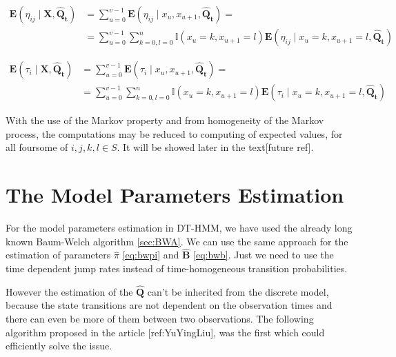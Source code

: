 \documentclass[thesis=M,english]{FITthesis}[2012/10/20]
\newcommand{\matr}[1]{\mathbf{#1}}
\begin{document}
\begin{equation}
\begin{aligned}  
\mathbf{E}(\eta_{ij} \mid \matr{X}, \matr{\hat Q_t} ) &= \sum_{u=0}^{v-1} \mathbf{E}(\eta_{ij} \mid x_u, x_{u+1}, \matr{ \hat Q_t } ) = \\
&= \sum_{u=0}^{v-1} \sum_{k=0,l=0}^{n} \mathbb{I}( x_u = k, x_{u+1} = l ) \mathbf{E}(\eta_{ij} \mid x_u = k, x_{u+1} = l, \matr{\hat Q_t} )
\end{aligned}
\end{equation}


\begin{equation}
\begin{aligned}  
\mathbf{E}( \tau_i \mid \matr{X}, \matr{\hat Q_t} ) &= \sum_{u=0}^{v-1} \mathbf{E}(\tau_i \mid x_u, x_{u+1}, \matr{ \hat Q_t } ) = \\
&= \sum_{u=0}^{v-1} \sum_{k=0,l=0}^{n} \mathbb{I}( x_u = k, x_{u+1} = l ) \mathbf{E}(\tau_i \mid x_u = k, x_{u+1} = l, \matr{\hat Q_t} )
\end{aligned}
\end{equation}
   
With the use of the Markov property and from homogeneity of the Markov process, the computations may be reduced to computing of expected values, for all foursome of $i,j,k,l \in S$. It will be showed later in the text[future ref].     
   
\section{The Model Parameters Estimation}


For the model parameters estimation in DT-HMM, we have used the already long known Baum-Welch algorithm \ref{sec:BWA}. We can use the same approach for the estimation of parameters $\hat \pi$ \eqref{eq:bwpi} and $\matr{ \hat B }$ \eqref{eq:bwb}. Just we need to use the time dependent jump rates instead of time-homogeneous transition probabilities. %

However the estimation of the $\matr{ \hat Q }$ can't be inherited from the discrete model, because the state transitions are not dependent on the observation times and there can even be more of them between two observations. The following algorithm proposed in the article [ref:YuYingLiu], was the first which could efficiently solve the issue.        
\end{document}
